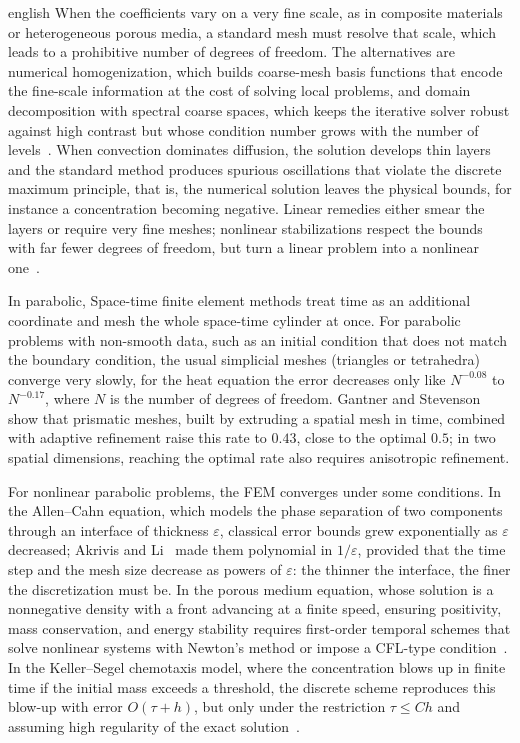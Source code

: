 \documentclass[../0000.tex]{subfiles}
\begin{document}
\begin{hyphenrules}{english}
When the coefficients vary on a very fine scale, as in composite materials or heterogeneous porous media, a standard mesh must resolve that scale, which leads to 
a prohibitive number of degrees of freedom. The alternatives are numerical homogenization, which builds coarse-mesh basis functions that encode the fine-scale information 
at the cost of solving local problems, and domain decomposition with spectral coarse spaces, which keeps the iterative solver robust against high contrast but 
whose condition number grows with the number of levels~\cite{hauck2023super,bastian2022multilevel}. When convection dominates diffusion, the solution develops thin layers and the standard method produces spurious oscillations that violate the 
discrete maximum principle, that is, the numerical solution leaves the physical bounds, for instance a concentration becoming negative. Linear remedies either 
smear the layers or require very fine meshes; nonlinear stabilizations respect the bounds with far fewer degrees of freedom, but turn a linear problem into a nonlinear 
one~\cite{barrenechea2024finite}.

In parabolic, Space-time finite element methods treat time as an additional coordinate and mesh the whole space-time cylinder at once. For parabolic problems with
non-smooth data, such as an initial condition that does not match the boundary condition, the usual simplicial meshes (triangles or tetrahedra) converge very slowly, 
for the heat equation the error decreases only like $N^{-0.08}$ to $N^{-0.17}$, where $N$ is the number of degrees of freedom. Gantner and Stevenson~\cite{gantner2024improved} 
show that prismatic meshes, built by extruding a spatial mesh in time, combined with adaptive refinement raise this rate to $0.43$, close to the optimal $0.5$; 
in two spatial dimensions, reaching the optimal rate also requires anisotropic refinement.

For nonlinear parabolic problems, the FEM converges under some conditions. In the Allen--Cahn equation, which models the phase separation of two components 
through an interface of thickness $\varepsilon$, classical error bounds grew exponentially as $\varepsilon$ decreased; Akrivis and Li~\cite{akrivis2022error}
made them polynomial in $1/\varepsilon$, provided that the time step and the mesh size decrease as powers of $\varepsilon$: the thinner the
interface, the finer the discretization must be. In the porous medium equation, whose solution is a nonnegative density with a front advancing at a finite
speed, ensuring positivity, mass conservation, and energy stability requires first-order temporal schemes that solve nonlinear systems with
Newton's method or impose a CFL-type condition~\cite{vijaywargiya2024two}. In the Keller--Segel chemotaxis model, where the concentration blows up in finite time
if the initial mass exceeds a threshold, the discrete scheme reproduces this blow-up with error $O(\tau+h)$, but only under the restriction $\tau\le Ch$ and assuming
high regularity of the exact solution~\cite{chen2022error}.


\end{hyphenrules}
\end{document}
